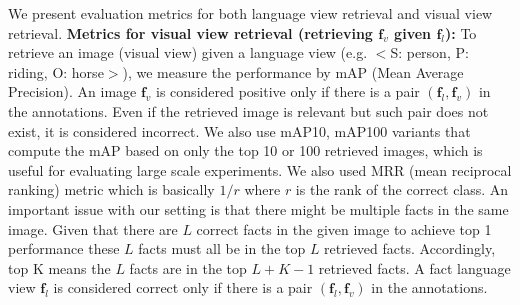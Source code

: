 \documentclass[runningheads]{llncs}
\begin{document}
We present evaluation metrics for both language view retrieval and visual view retrieval.
\noindent\textbf{Metrics for  visual view retrieval  (retrieving $\mathbf{f}_v$ given $\mathbf{f}_l$): }  To retrieve an image (visual view) given a language view (e.g.  $<$S: person, P: riding, O: horse$>$), we measure the performance by mAP (Mean Average Precision).%
An image $\mathbf{f}_v$ is considered positive only if there is a pair $(\mathbf{f}_l, \mathbf{f}_v)$ in the annotations. Even if the retrieved image is relevant but such pair does not exist, it is considered incorrect.  We also use  mAP10, mAP100 variants
that compute the mAP based on only the top 10 or 100 retrieved images, which is useful for evaluating large scale experiments.%
We also used MRR (mean reciprocal ranking) metric which is basically $1/r$ where $r$ is the rank of the correct class. An important issue with our setting is that there might be multiple facts in the same image. Given that there are $L$ correct facts in the given image to achieve top 1 performance these $L$ facts must all be in the top $L$ retrieved facts. Accordingly, top K means the $L$ facts are in the top $L+K-1$ retrieved facts.
A fact language view $\mathbf{f}_l$ is considered correct only if there is a pair $(\mathbf{f}_l, \mathbf{f}_v)$ in the annotations.
\end{document}
